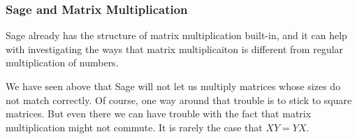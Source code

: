 \documentclass[10pt,]{book}
\theoremstyle{plain}
\theoremstyle{definition}
\numberwithin{equation}{section}
\begin{document}
\subsubsection[Sage and Matrix Multiplication]{Sage and Matrix Multiplication}\label{subsubsection-18}

        Sage already has the structure of matrix multiplication built-in, and
        it can help with investigating the ways that matrix multiplicaiton
        is different from regular multiplication of numbers.
\par

        We have seen above
        that Sage will not let us multiply matrices whose sizes do not match
        correctly.  Of course, one way around that trouble is to stick to square
        matrices. But even there we can have trouble with the fact that matrix
        multiplication might not commute. It is rarely the case that \(XY = YX\).
\par
\end{document}
